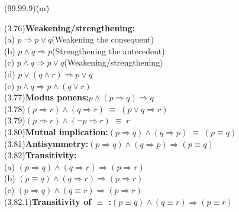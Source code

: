 \documentclass{amsart}
\newcommand{\lgap}{2pt}                             %
\newcommand{\equivs}{\ensuremath{\;\equiv\;}}       %
\newcommand{\impl}{\ensuremath{\Rightarrow}}        %
\begin{document}
\begin{tabbing}
(99.99.9)\;\=(m)\;\=\kill

(3.76)\>\textbf{Weakening/strengthening:}\\
      \> (a)\> $p\impl p\lor q$\quad \quad \quad (Weakening the consequent)\\[\lgap]
      \> (b)\> $p\land q \impl p$\quad \quad \quad (Strengthening the antecedent)\\[\lgap]
      \> (c)\> $p\land q \impl p\lor q$\quad \quad \quad (Weakening/strengthening)\\[\lgap]
      \> (d)\> $p\lor (q\land r) \impl p\lor q$\\[\lgap]
      \> (e)\> $p\land q \impl p\land (q \lor r)$\\[\lgap]
(3.77)\>\textbf{Modus ponens:}\quad $p\land (p\impl q)\impl q$\\[\lgap]
(3.78)\>$(p\impl r) \land (q\impl r) \equivs (p\lor q\impl r)$\\[\lgap]
(3.79)\>$(p\impl r) \land (\neg p\impl r) \equivs r$\\[\lgap]
(3.80)\>\textbf{Mutual implication:}\quad $(p\impl q) \land (q\impl p) \equivs (p\equiv q)$\\[\lgap]
(3.81)\>\textbf{Antisymmetry:}\quad $(p\impl q) \land (q\impl p) \impl (p\equiv q)$\\[\lgap]
(3.82)\>\textbf{Transitivity:}\\
      \> (a)\> $(p\impl q) \land (q\impl r) \impl (p\impl r)$\\[\lgap]
      \> (b)\> $(p\equiv q) \land (q\impl r) \impl (p\impl r)$\\[\lgap]
      \> (c)\> $(p\impl q) \land (q\equiv r) \impl (p\impl r)$\\[\lgap]
(3.82.1)\>\textbf{Transitivity of $\equiv$ :}\quad $(p\equiv q)\land (q\equiv r)\impl (p\equiv r)$\\
\end{tabbing}
\end{document}
